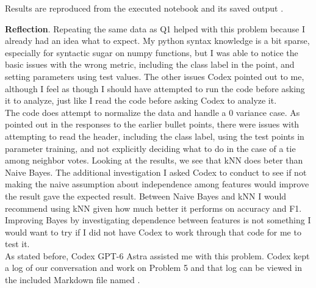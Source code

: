 \documentclass[12pt]{article}
\begin{document}
\begin{enumerate}
\noindent Results are reproduced from the executed notebook
 and its saved output
.

\textbf{Reflection}. Repeating the same data as Q1 helped with this problem because I already had an idea what to expect. My python syntax knowledge is a bit sparse, especially for syntactic sugar on numpy functions, but
I was able to notice the basic issues with the wrong metric, including the class label in the point, and setting parameters using test values. The other issues Codex pointed out to me, although I feel as though I should have attempted to run
the code before asking it to analyze, just like I read the code before asking Codex to analyze it.\\

The code does attempt to normalize the data and handle a 0 variance case. As pointed out in the responses to the earlier bullet points, there were issues with attempting to read the header, including the class label, using the test points in parameter training, and not explicitly deciding what to do in the case
of a tie among neighbor votes. Looking at the results, we see that kNN does beter than Naive Bayes. The additional investigation I asked Codex to conduct to see if not making the naive assumption about independence among features would improve the result gave the 
expected result. Between Naive Bayes and kNN I would recommend using kNN given how much better it performs on accuracy and F1. Improving Bayes by investigating dependence between features is not something I would want to try if I did not have Codex to work through that code for me to test it.\\

As stated before, Codex GPT-6 Astra assisted me with this problem. Codex kept a log of our conversation and work on Problem 5 and that log can be viewed in the included Markdown file named . 

\end{enumerate}

\nocite{papernot2018deep,bergman2020deep}


\end{document}
